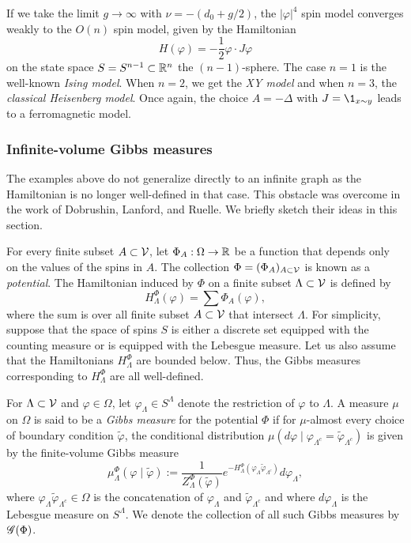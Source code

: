 If we take the limit $g\to\infty$ with $\nu = -(d_0 + g / 2)$, the
$|\varphi|^4$ spin model converges
weakly to the $O(n)$ spin model, given by the Hamiltonian
\begin{equation}
H(\varphi) = -\frac{1}{2} \varphi \cdot J \varphi
\end{equation}
on the state space $S = S^{n-1} \subset {\mathbb R}^n$ the $(n-1)$-sphere.
The case $n = 1$ is the well-known \emph{Ising model}. When $n = 2$, we get the \emph{XY model}
and when $n = 3$, the \emph{classical Heisenberg model}.
Once again, the choice $A = -\Delta$ with $J = \1_{x \sim y}$ leads to a ferromagnetic model.


\subsubsection{Infinite-volume Gibbs measures}

The examples above do not generalize directly to an infinite graph as
the Hamiltonian is no longer well-defined in that case. This obstacle was overcome in the work
of Dobrushin, Lanford, and Ruelle. We briefly sketch their ideas in this section.

For every finite subset $A \subset \mathcal{V}$, let $\Phi_A : \Omega \rightarrow {\mathbb R}$ be a function that
depends only on the values of the spins in $A$. The collection $\Phi = (\Phi_A)_{A\subset\mathcal{V}}$
is known as a \emph{potential}. The Hamiltonian induced by $\Phi$ on a finite
subset $\Lambda \subset \mathcal{V}$ is defined by
\begin{equation}
H^\Phi_\Lambda(\varphi) = \sum \Phi_A(\varphi),
\end{equation}
where the sum is over all finite subset $A \subset \mathcal{V}$ that intersect $\Lambda$.
For simplicity, suppose that the space of spins $S$ is either a discrete set equipped with the
counting measure or is equipped with the Lebesgue measure. Let us also assume that the Hamiltonians
$H^\Phi_\Lambda$ are bounded below. Thus, the  Gibbs measures corresponding to $H^\Phi_\Lambda$ are
all well-defined.

For $\Lambda \subset \mathcal{V}$ and $\varphi \in \Omega$, let $\varphi_\Lambda \in S^\Lambda$
denote the restriction of $\varphi$ to $\Lambda$.
A measure $\mu$ on $\Omega$ is said to be a \emph{Gibbs measure} for the potential $\Phi$
if for $\mu$-almost
every choice of boundary condition $\tilde\varphi$, the conditional distribution
$\mu(d\varphi \mid \varphi_{\Lambda^c} = \tilde\varphi_{\Lambda^c})$ is given by the finite-volume Gibbs
measure
\begin{equation}
\mu^\Phi_\Lambda(\varphi \mid \tilde\varphi)
  :=
\frac{1}{Z^\Phi_\Lambda(\tilde\varphi)}
e^{-H^\Phi_\Lambda(\varphi_\Lambda \tilde\varphi_{\Lambda^c})}
d\varphi_\Lambda,
\end{equation}
where $\varphi_\Lambda\tilde\varphi_{\Lambda^c} \in \Omega$ is the concatenation of
$\varphi_\Lambda$ and $\tilde\varphi_{\Lambda^c}$
and where $d\varphi_\Lambda$ is the Lebesgue measure on $S^\Lambda$.
We denote the collection of all such Gibbs measures by $\mathscr{G}(\Phi)$.

